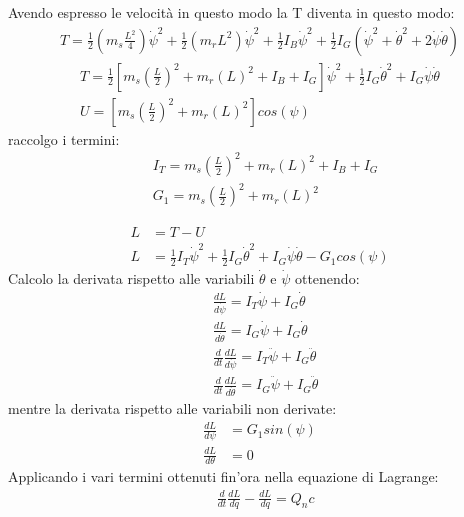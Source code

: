 \documentclass{article}
\begin{document}
Avendo espresso le velocità in questo modo la T diventa in questo modo:
\begin{gather}
T = \frac{1}{2}(m_s\frac{L^2}{4})\dot{\psi}^2+
\frac{1}{2}(m_rL^2)\dot{\psi}^2+
\frac{1}{2}I_B\dot{\psi}^2+
\frac{1}{2}I_G(\dot\psi^2+\dot{\theta}^2+2\dot\psi\dot\theta)
\end{gather}
\begin{gather}
T = \frac{1}{2}[m_s(\frac{L}{2})^2+m_r(L)^2+I_B+I_G]\dot{\psi}^2+
\frac{1}{2}I_G\dot{\theta}^2+I_G\dot\psi\dot\theta\\
U = [m_s(\frac{L}{2})^2+m_r(L)^2]cos(\psi)
\end{gather}
raccolgo i termini:
\begin{align}
&I_{T} = m_s(\frac{L}{2})^2+m_r(L)^2+I_B+I_G\\
&G_1 = m_s(\frac{L}{2})^2+m_r(L)^2
\end{align}

\begin{align}
L &= T-U\\
L &= \frac{1}{2}I_{T}\dot{\psi}^2+\frac{1}{2}I_G\dot{\theta}^2+I_G\dot\psi\dot\theta-G_1cos(\psi)
\end{align}
Calcolo la derivata rispetto alle variabili $\dot\theta$ e  $\dot\psi$ ottenendo:
\begin{align}
&\frac{dL}{d\dot\psi} = I_{T}\dot{\psi} + I_G\dot\theta\\ 
&\frac{dL}{d\dot\theta} = I_G\dot{\psi} + I_G\dot{\theta}\\
&\frac{d}{dt}\frac{dL}{d\dot\psi} = I_{T}\ddot{\psi} + I_G\ddot\theta\\
&\frac{d}{dt}\frac{dL}{d\dot\theta} =  I_G\ddot\psi + I_G\ddot\theta
\end{align}
mentre la derivata rispetto alle variabili non derivate:
\begin{align}
\frac{dL}{d\psi} & = G_1 sin(\psi)\\
\frac{dL}{d\theta} & = 0
\end{align}
Applicando i vari termini ottenuti fin'ora nella equazione di Lagrange:
\begin{align*}
&\frac{d}{dt}\frac{dL}{d\dot q}-\frac{dL}{dq} = Q_nc
\end{align*}
\end{document}
